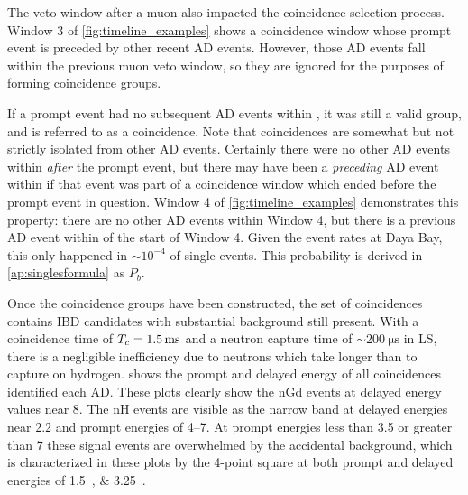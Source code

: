 The veto window after a muon also impacted the coincidence selection process.
Window 3 of \cref{fig:timeline_examples} shows a coincidence window
whose prompt event is preceded by other recent AD events.
However, those AD events fall within the previous muon veto window,
so they are ignored for the purposes of forming coincidence groups.

If a prompt event had no subsequent AD events within \tc, it was
still a valid group, and is referred to as a  coincidence.
Note that  coincidences are somewhat but not strictly isolated
from other AD events.
Certainly there were no other AD events
within \tc{} \textit{after} the prompt event,
but there may have been a \textit{preceding} AD event within \tc{}
if that event was part of a coincidence window
which ended before the prompt event in question.
Window 4 of \cref{fig:timeline_examples} demonstrates this property:
there are no other AD events within Window 4,
but there is a previous AD event within \tc{} of the start of Window 4.
Given the event rates at Daya Bay, this only happened in $\sim10^{-4}$
of single events.
This probability is derived in \cref{ap:singlesformula} as $P_b$.



Once the coincidence groups have been constructed,
the set of  coincidences
contains IBD candidates
with substantial background still present.
With a coincidence time of $\tc=\SI{1.5}{\ms}$
and a neutron capture time of $\sim\SI{200}{\us}$ in LS,
there is a negligible inefficiency due to neutrons
which take longer than \tc{} to capture on hydrogen.
 shows the prompt and delayed energy
of all  coincidences identified each AD.
These plots clearly show the nGd events
at delayed energy values near \SI{8}{\mev}.
The nH events are visible as the narrow band at
delayed energies near \SI{2.2}{\mev}
and prompt energies of \SIrange{4}{7}{\mev}.
At prompt energies less than \SI{3.5}{\mev} or greater than \SI{7}{\mev}
these signal events are overwhelmed by the accidental background,
which is characterized in these plots by the 4-point square at both prompt and
delayed energies of \SIlist{1.5;3.25}{\mev}.

